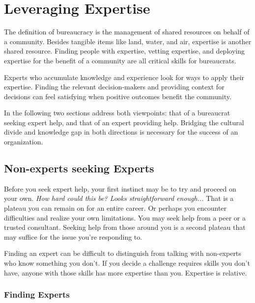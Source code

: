 \section{Leveraging Expertise\label{sec:expertise}}



The definition of \gls{bureaucracy} is the management of shared resources on behalf of a community. Besides tangible items like land, water, and air, expertise is another shared resource. Finding people with expertise, vetting expertise, and deploying expertise for the benefit of a community are all critical skills for bureaucrats. 

Experts who accumulate knowledge and experience look for ways to apply their expertise. Finding the relevant decision-makers and providing context for decisions can feel satisfying when positive  outcomes benefit the community. 


In the following two sections address both viewpoints: that of a bureaucrat seeking expert help, and that of an expert providing help. Bridging the cultural divide and knowledge gap in both directions is necessary for the success of an organization.

\subsection*{Non-experts seeking Experts}

Before you seek expert help, your first instinct may be to try and proceed on your own. \textit{How hard could this be? Looks straightforward enough...} That is a plateau you can remain on for an entire career. Or perhaps you encounter difficulties and realize your own limitations. You may seek help from a peer or a trusted consultant. Seeking help from those around you is a second plateau that may suffice for the issue you're responding to. 

Finding an expert can be difficult to distinguish from talking with non-experts who know something you don't. If you decide a challenge requires skills you don't have, anyone with those skills has more expertise than you. Expertise is relative. 

\subsubsection*{Finding Experts}

